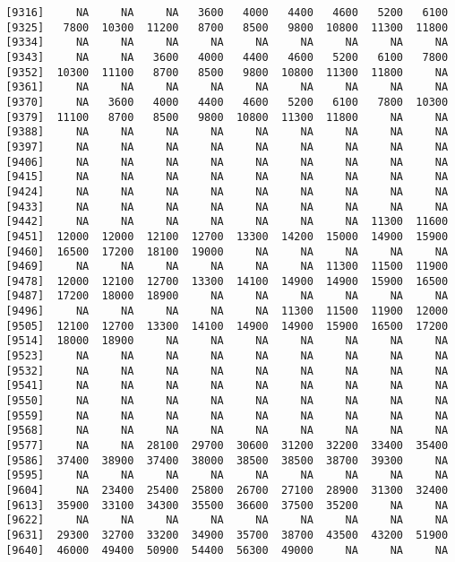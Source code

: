 \documentclass[]{article}
\begin{document}
\begin{verbatim}
 [9316]     NA     NA     NA   3600   4000   4400   4600   5200   6100
 [9325]   7800  10300  11200   8700   8500   9800  10800  11300  11800
 [9334]     NA     NA     NA     NA     NA     NA     NA     NA     NA
 [9343]     NA     NA   3600   4000   4400   4600   5200   6100   7800
 [9352]  10300  11100   8700   8500   9800  10800  11300  11800     NA
 [9361]     NA     NA     NA     NA     NA     NA     NA     NA     NA
 [9370]     NA   3600   4000   4400   4600   5200   6100   7800  10300
 [9379]  11100   8700   8500   9800  10800  11300  11800     NA     NA
 [9388]     NA     NA     NA     NA     NA     NA     NA     NA     NA
 [9397]     NA     NA     NA     NA     NA     NA     NA     NA     NA
 [9406]     NA     NA     NA     NA     NA     NA     NA     NA     NA
 [9415]     NA     NA     NA     NA     NA     NA     NA     NA     NA
 [9424]     NA     NA     NA     NA     NA     NA     NA     NA     NA
 [9433]     NA     NA     NA     NA     NA     NA     NA     NA     NA
 [9442]     NA     NA     NA     NA     NA     NA     NA  11300  11600
 [9451]  12000  12000  12100  12700  13300  14200  15000  14900  15900
 [9460]  16500  17200  18100  19000     NA     NA     NA     NA     NA
 [9469]     NA     NA     NA     NA     NA     NA  11300  11500  11900
 [9478]  12000  12100  12700  13300  14100  14900  14900  15900  16500
 [9487]  17200  18000  18900     NA     NA     NA     NA     NA     NA
 [9496]     NA     NA     NA     NA     NA  11300  11500  11900  12000
 [9505]  12100  12700  13300  14100  14900  14900  15900  16500  17200
 [9514]  18000  18900     NA     NA     NA     NA     NA     NA     NA
 [9523]     NA     NA     NA     NA     NA     NA     NA     NA     NA
 [9532]     NA     NA     NA     NA     NA     NA     NA     NA     NA
 [9541]     NA     NA     NA     NA     NA     NA     NA     NA     NA
 [9550]     NA     NA     NA     NA     NA     NA     NA     NA     NA
 [9559]     NA     NA     NA     NA     NA     NA     NA     NA     NA
 [9568]     NA     NA     NA     NA     NA     NA     NA     NA     NA
 [9577]     NA     NA  28100  29700  30600  31200  32200  33400  35400
 [9586]  37400  38900  37400  38000  38500  38500  38700  39300     NA
 [9595]     NA     NA     NA     NA     NA     NA     NA     NA     NA
 [9604]     NA  23400  25400  25800  26700  27100  28900  31300  32400
 [9613]  35900  33100  34300  35500  36600  37500  35200     NA     NA
 [9622]     NA     NA     NA     NA     NA     NA     NA     NA     NA
 [9631]  29300  32700  33200  34900  35700  38700  43500  43200  51900
 [9640]  46000  49400  50900  54400  56300  49000     NA     NA     NA

\end{verbatim}
\end{document}
